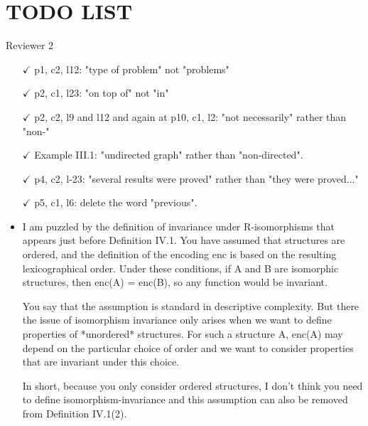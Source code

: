 
\section*{\LARGE \textbf{TODO LIST}}

\bigskip

Reviewer 2

\begin{itemize}

\item[$\checkmark$] p1, c2, l12: "type of problem" not "problems"

\item[$\checkmark$] p2, c1, l23: "on top of" not "in"

\item[$\checkmark$] p2, c2, l9 and l12 and again at p10, c1, l2: "not necessarily" rather than "non-"

\item[$\checkmark$] Example III.1: "undirected graph" rather than "non-directed".

\item[$\checkmark$] p4, c2, l-23: "several results were proved" rather than "they were
proved..."

\item[$\checkmark$] p5, c1, l6: delete the word "previous".

\item I am puzzled by the definition of invariance under R-isomorphisms
that appears just before Definition IV.1. You have assumed that
structures are ordered, and the definition of the encoding enc is
based on the resulting lexicographical order. Under these
conditions, if A and B are isomorphic structures, then enc(A) =
enc(B), so any function would be invariant.

You say that the assumption is standard in descriptive complexity.
But there the issue of isomorphism invariance only arises when we
want to define properties of *unordered* structures. For such a
structure A, enc(A) may depend on the particular choice of order
and we want to consider properties that are invariant under this
choice.

In short, because you only consider ordered structures, I don't
think you need to define isomorphism-invariance and this assumption
can also be removed from Definition IV.1(2).


\end{itemize}

